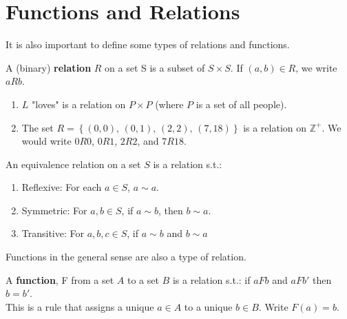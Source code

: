 \documentclass[../main.tex]{subfiles}
\begin{document}
\section{Functions and Relations}

It is also important to define some types of relations and functions.

\begin{definition}[Relation]
    A (binary) \textbf{relation} \( R \) on a set S is a subset of \( S \times S \). If \( (a,b) \in R \), we write \( aRb \).
\end{definition}

\begin{example}[of relations]

    \begin{enumerate}
        \item \( L \) "loves" is a relation on \( P \times P \) (where \( P \) is a set of all people).
        \item The set \( R = \left\{ (0,0), \, (0,1), \, (2,2), \, (7,18) \right\} \) is a relation on \( \mathbb{Z}^+ \). We would write \( 0R0 \), \( 0R1 \), \( 2R2 \), and \( 7R18 \).
    \end{enumerate}
\end{example}

\begin{definition}
    An equivalence relation on a set \( S \) is a relation s.t.:
    \begin{enumerate}
        \item Reflexive: For each \( a \in S \), \( a \sim a \).
        \item Symmetric: For \( a,b \in S \), if \( a \sim b \), then \( b \sim a \).
        \item Transitive: For \( a,b,c \in S \), if \( a \sim b \) and \( b \sim a \)
    \end{enumerate}
\end{definition}

Functions in the general sense are also a type of relation.
\begin{definition}[Function]
    A \textbf{function}, F from a set \( A \) to a set \( B \) is a relation s.t.:
    if \( aFb \) and \( aFb' \) then \( b = b' \). \\
    This is a rule that assigns a unique \( a \in A \) to a unique \( b \in B \).
    Write \( F(a) = b \).
\end{definition}
\end{document}

